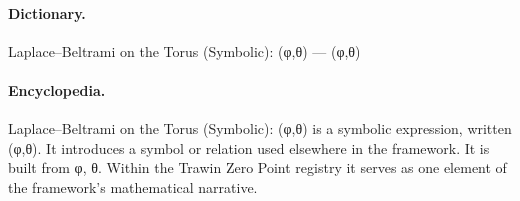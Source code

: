 \paragraph{Dictionary.}
Laplace–Beltrami on the Torus (Symbolic): (φ,θ) — (φ,θ)

\paragraph{Encyclopedia.}
Laplace–Beltrami on the Torus (Symbolic): (φ,θ) is a symbolic expression, written (φ,θ). It introduces a symbol or relation used elsewhere in the framework. It is built from φ, θ. Within the Trawin Zero Point registry it serves as one element of the framework's mathematical narrative.
